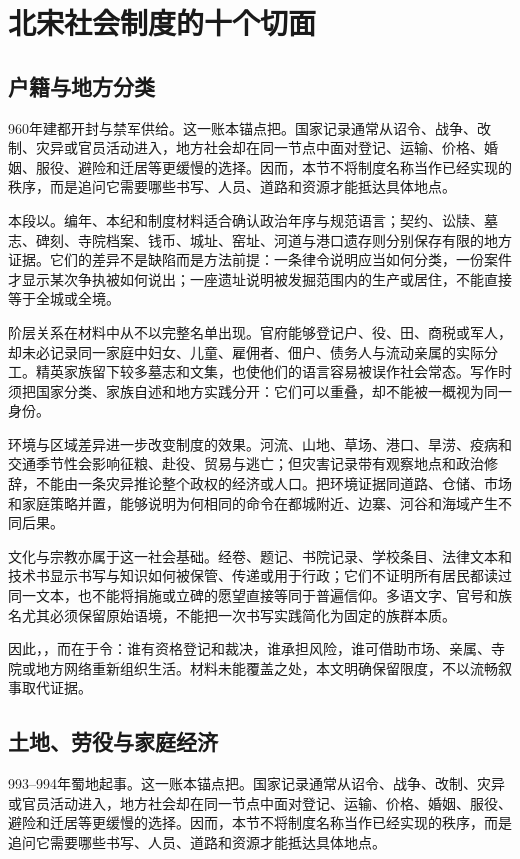 \section{北宋社会制度的十个切面}

\subsection{户籍与地方分类}

960年建都开封与禁军供给。这一账本锚点把。国家记录通常从诏令、战争、改制、灾异或官员活动进入，地方社会却在同一节点中面对登记、运输、价格、婚姻、服役、避险和迁居等更缓慢的选择。因而，本节不将制度名称当作已经实现的秩序，而是追问它需要哪些书写、人员、道路和资源才能抵达具体地点。

本段以。编年、本纪和制度材料适合确认政治年序与规范语言；契约、讼牍、墓志、碑刻、寺院档案、钱币、城址、窑址、河道与港口遗存则分别保存有限的地方证据。它们的差异不是缺陷而是方法前提：一条律令说明应当如何分类，一份案件才显示某次争执被如何说出；一座遗址说明被发掘范围内的生产或居住，不能直接等于全城或全境。

阶层关系在材料中从不以完整名单出现。官府能够登记户、役、田、商税或军人，却未必记录同一家庭中妇女、儿童、雇佣者、佃户、债务人与流动亲属的实际分工。精英家族留下较多墓志和文集，也使他们的语言容易被误作社会常态。写作时须把国家分类、家族自述和地方实践分开：它们可以重叠，却不能被一概视为同一身份。

环境与区域差异进一步改变制度的效果。河流、山地、草场、港口、旱涝、疫病和交通季节性会影响征粮、赴役、贸易与逃亡；但灾害记录带有观察地点和政治修辞，不能由一条灾异推论整个政权的经济或人口。把环境证据同道路、仓储、市场和家庭策略并置，能够说明为何相同的命令在都城附近、边寨、河谷和海域产生不同后果。

文化与宗教亦属于这一社会基础。经卷、题记、书院记录、学校条目、法律文本和技术书显示书写与知识如何被保管、传递或用于行政；它们不证明所有居民都读过同一文本，也不能将捐施或立碑的愿望直接等同于普遍信仰。多语文字、官号和族名尤其必须保留原始语境，不能把一次书写实践简化为固定的族群本质。

因此，，而在于令：谁有资格登记和裁决，谁承担风险，谁可借助市场、亲属、寺院或地方网络重新组织生活。材料未能覆盖之处，本文明确保留限度，不以流畅叙事取代证据。

\subsection{土地、劳役与家庭经济}

993--994年蜀地起事。这一账本锚点把。国家记录通常从诏令、战争、改制、灾异或官员活动进入，地方社会却在同一节点中面对登记、运输、价格、婚姻、服役、避险和迁居等更缓慢的选择。因而，本节不将制度名称当作已经实现的秩序，而是追问它需要哪些书写、人员、道路和资源才能抵达具体地点。

